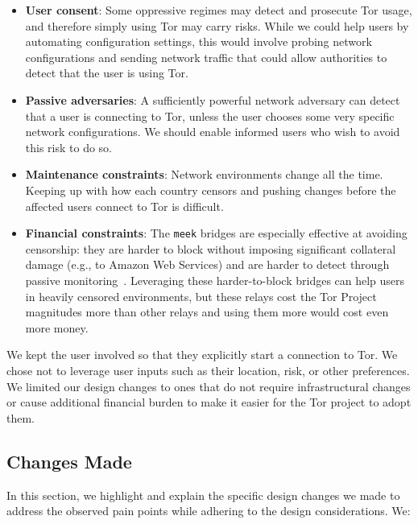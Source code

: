 \documentclass[USenglish,oneside,twocolumn]{article}
\begin{document}
\begin{itemize}
\item {\bfseries User consent}: Some oppressive regimes may detect and prosecute Tor usage, and therefore simply using Tor may carry risks. While we could help users by automating configuration settings, this would involve probing network configurations and sending network traffic that could allow authorities to detect that the user is using Tor.


\item {\bfseries Passive adversaries}: A sufficiently powerful network adversary can detect that a user is connecting to Tor, unless the user chooses some very specific network configurations. We should enable informed users who wish to avoid this risk to do so.

\item{\bfseries Maintenance constraints}: Network environments change all the time. Keeping up with how each country censors and pushing changes before the affected users connect to Tor is difficult.

\item{\bfseries Financial constraints}: The \texttt{meek} bridges are especially effective at avoiding censorship: they are harder to block without imposing significant collateral damage (e.g., to Amazon Web Services) and are harder to detect through passive monitoring~\cite{fifield2015blocking}.
Leveraging these harder-to-block bridges can help users in heavily censored environments, but these relays cost the Tor Project magnitudes more than other relays and using them more would cost even more money.
\end{itemize}

We kept the user involved so that they explicitly start a connection to Tor. We chose not to leverage user inputs such as their location, risk, or other preferences. We limited our design changes to ones that do not require infrastructural changes or cause additional financial burden to make it easier for the Tor project to adopt them.

\subsection{Changes Made} 
In this section, we highlight and explain the specific design changes we made to address the observed pain points while adhering to the design considerations. We: \\
\end{document}
